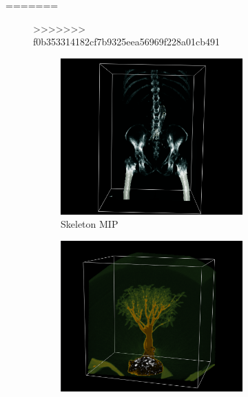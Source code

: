 \documentclass[a4paper,twoside,11pt]{article}
\begin{document}
\begin{figure}[h]
=======

\begin{figure}[h!]
>>>>>>> f0b353314182cf7b9325eea56969f228a01cb491
    \begin{center}
        \begin{subfigure}[b]{0.32\textwidth}
            \includegraphics[width=\textwidth]{SanderImages/SkeletonMIPZ.png}
            \caption{Skeleton MIP}
            \label{fig:Skeleton}
        \end{subfigure}
        \begin{subfigure}[b]{0.33\textwidth}
            \includegraphics[width=\textwidth]{SanderImages/BonsaiMIPZ.png}

\end{subfigure}
\end{center}
\end{figure}
\end{figure}
\end{document}
